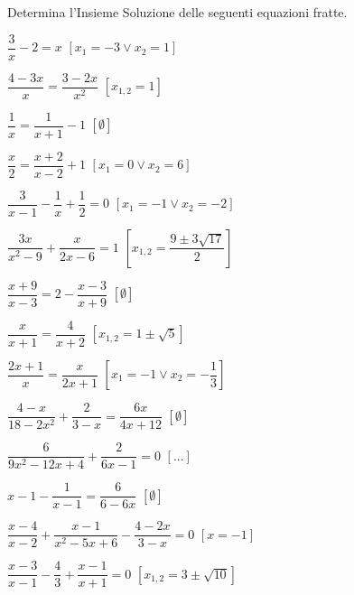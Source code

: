 \begin{esercizio}[\Ast]
\label{ese:3.39}
Determina l'Insieme Soluzione delle seguenti equazioni fratte.
\begin{multicols}{2}
\begin{enumeratea}
\item$\dfrac{3}{x}-2 = x$
  \hfill$\left[x_{1} =-3 \vee x_{2} = 1\right]$
\item$\dfrac{4-3 x}{x}=\dfrac{3-2 x}{x^{2}}$
  \hfill$\left[x_{1,2}= 1\right]$
\item$\dfrac{1}{x} = \dfrac{1}{x + 1}-1$
  \hfill$\left[\emptyset\right]$
\item$\dfrac{x}{2} = \dfrac{x + 2}{x-2} + 1$
  \hfill$\left[x_{1} = 0 \vee x_{2} = 6\right]$
\item$\dfrac{3}{x-1}-\dfrac{1}{x} + \dfrac{1}{2} = 0$
  \hfill$\left[x_{1} =-1 \vee x_{2} =-2\right]$
\item$\dfrac{3 x}{x^{2}-9} + \dfrac{x}{2 x-6}=1$
  \hfill$\left[x_{1,2} = \dfrac{9 \pm 3 \sqrt{17}}{2}\right]$
\item$\dfrac{x + 9}{x-3}=2-\dfrac{x-3}{x + 9}$
  \hfill$\left[\emptyset\right]$
\item$\dfrac{x}{x + 1} = \dfrac{4}{x + 2}$
  \hfill$\left[x_{1,2} = 1 \pm \sqrt{5}\right]$
\item$\dfrac{2 x + 1}{x} = \dfrac{x}{2 x + 1}$
  \hfill$\left[x_{1} =-1 \vee x_{2} =-\dfrac{1}{3}\right]$
\item$\dfrac{4-x}{18-2 x^{2}} + \dfrac{2}{3-x} = \dfrac{6 x}{4 x +12}$
  \hfill$\left[\emptyset\right]$
\item$\dfrac{6}{9 x^{2}-12 x + 4} + \dfrac{2}{6x -1} =0$
  \hfill$\left[...\right]$
\item$x-1-\dfrac{1}{x-1} = \dfrac{6}{6-6 x}$
  \hfill$\left[\emptyset\right]$
\item$\dfrac{x-4}{x-2} + \dfrac{x-1}{x^{2}-5 x + 6}-\dfrac{4 -2 x}{3-x} = 0$
  \hfill$\left[x =-1\right]$
\item$\dfrac{x-3}{x-1}-\dfrac{4}{3} + \dfrac{x-1}{x + 1}=0$
  \hfill$\left[x_{1,2} = 3 \pm \sqrt{10}\right]$
\end{enumeratea}
\end{multicols}
\end{esercizio}

